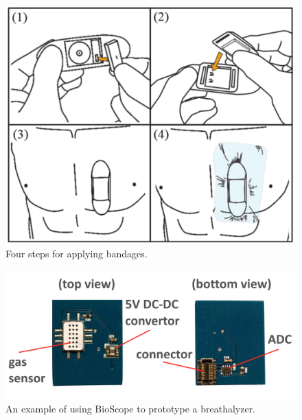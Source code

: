 \begin{figure}
\centering
\includegraphics[width=15cm]{image/bio_fig2}
\caption{Four steps for applying bandages.}
\label{bio_steps}
\end{figure}


\begin{figure}
\centering
\includegraphics[width=15cm]{image/bio_dc_adc}
\caption{An example of using BioScope to prototype a breathalyzer.}
\label{dc_adc}
\end{figure}

\vspace{10pt}
